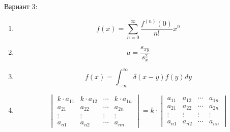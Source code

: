 \documentclass[a4paper]{article}
\begin{document}
Вариант 3:
\begin{enumerate}
	\item \[f(x) = \sum_{n = 0}^{\infty} \frac{f^{(n)}(0)}{n!}x^n\]
	\item \[a = \frac{s_{xy}}{s_x^2}\]
	\item \[f(x) = \int_{-\infty}^{\infty} \delta (x-y) f(y)dy\]
	\item \[\begin{vmatrix}
			      k\cdot a_{11} & k\cdot a_{12} & \cdots & k\cdot a_{1n} \\
			      a_{21}        & a_{22}        & \cdots & a_{2n}        \\
			      \vdots        & \vdots        & \vdots & \vdots        \\
			      a_{n1}        & a_{n2}        & \cdots & a_{nn}
		      \end{vmatrix} = k \cdot \begin{vmatrix}
			      a_{11} & a_{12} & \cdots & a_{1n} \\
			      a_{21} & a_{22} & \cdots & a_{2n} \\
			      \vdots & \vdots & \vdots & \vdots \\
			      a_{n1} & a_{n2} & \cdots & a_{nn}
		      \end{vmatrix}\]
\end{enumerate}
\end{document}
